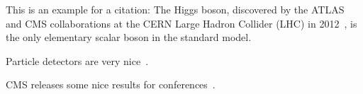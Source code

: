 \label{sec:theory}

This is an example for a citation:
The Higgs boson, discovered by the ATLAS and CMS collaborations at the CERN Large Hadron Collider (LHC) in 2012~\cite{ATLAS:2012yve,CMS:2012qbp}, is the only elementary scalar boson in the standard model.

Particle detectors are very nice~\cite{Kolanoski:2016gyf}.


CMS releases some nice results for conferences~\cite{CMS-PAS-SMP-22-009}.